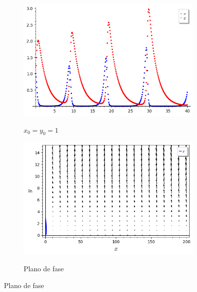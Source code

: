 \begin{figure}[H]
    \centering
    \begin{subfigure}{0.4\textwidth}
        \includegraphics[scale=0.48]{figuras/RM-citros (1,1) plot.png}
        \label{fig:RM-citros_1}
        \caption{$x_0 = y_0 = 1$}
    \end{subfigure}
    \begin{subfigure}{0.4\textwidth}
        \includegraphics[scale=0.48]{figuras/RM-citros (1,1) plano.png}
        \label{fig:RM-citros_2}
        \caption{Plano de fase}
    \end{subfigure}
\end{figure}

